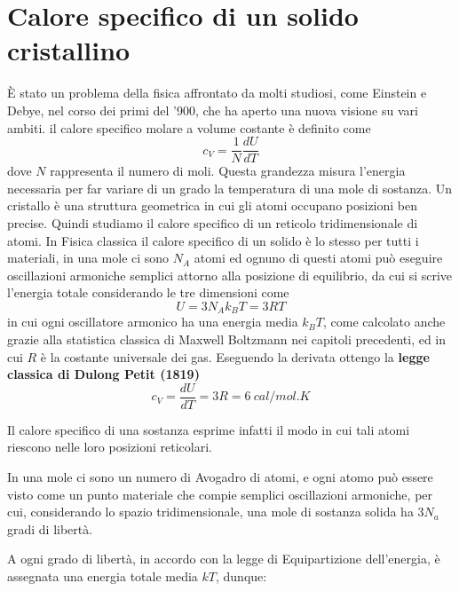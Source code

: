 

\section{Calore specifico di un solido cristallino}
È stato un problema della fisica affrontato da molti studiosi, come Einstein e Debye, nel corso dei primi del '900, che ha aperto una nuova visione su vari ambiti.
il calore specifico molare a volume costante è definito come
\begin{equation}
c_V = \frac{1}{N} \frac{dU}{dT}
\end{equation}
dove $N$ rappresenta il numero di moli.
Questa grandezza misura l'energia necessaria per far variare di un grado la temperatura di una mole di sostanza.
Un cristallo è una struttura geometrica in cui gli atomi occupano posizioni ben precise.
Quindi studiamo il calore specifico di un reticolo tridimensionale di atomi.
In Fisica classica il calore specifico di un solido è lo stesso per tutti i materiali, in una mole ci sono $N_A$ atomi ed ognuno di questi atomi può eseguire oscillazioni armoniche semplici attorno alla posizione di equilibrio, da cui si scrive l'energia totale considerando le tre dimensioni come
\begin{equation}
U = 3 N_A k_B T = 3 R T
\end{equation}
in cui ogni oscillatore armonico ha una energia media $k_B T$, come calcolato anche grazie alla statistica classica di Maxwell Boltzmann nei capitoli precedenti, 
ed in cui $R$ è la costante universale dei gas.
Eseguendo la derivata ottengo la \textbf{legge classica di Dulong Petit (1819)}
\begin{equation}
c_V = \frac{dU}{dT} = 3 R = \SI{6}{cal / mol . K}
\end{equation}




\newpage


Il calore specifico di una sostanza esprime infatti il modo in cui tali atomi riescono nelle loro posizioni reticolari.

In una mole ci sono un numero di Avogadro di atomi, e ogni atomo può essere visto come un punto materiale che compie semplici oscillazioni armoniche, per cui,
considerando lo spazio tridimensionale, una mole di sostanza solida ha $3 N_a$ gradi di libertà.

A ogni grado di libertà, in accordo con la legge di Equipartizione dell'energia, è assegnata una energia totale media $kT$, dunque:


